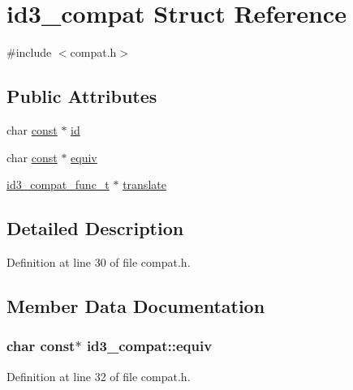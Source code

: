 \hypertarget{structid3__compat}{}\section{id3\+\_\+compat Struct Reference}
\label{structid3__compat}


{\ttfamily \#include $<$compat.\+h$>$}

\subsection*{Public Attributes}
\begin{DoxyCompactItemize}
\item 
char \hyperlink{getopt1_8c_a2c212835823e3c54a8ab6d95c652660e}{const} $\ast$ \hyperlink{structid3__compat_a4bbfd05aa33c47385219a3f8d4d711c4}{id}
\item 
char \hyperlink{getopt1_8c_a2c212835823e3c54a8ab6d95c652660e}{const} $\ast$ \hyperlink{structid3__compat_a425ee19ac8014f40ca4a2460c8f44aa3}{equiv}
\item 
\hyperlink{libid3tag_2compat_8h_afdd65fc8c780f84b3a5340f3d5ad2a18}{id3\+\_\+compat\+\_\+func\+\_\+t} $\ast$ \hyperlink{structid3__compat_a99f45f7c496cce28f8460562e949b427}{translate}
\end{DoxyCompactItemize}


\subsection{Detailed Description}


Definition at line 30 of file compat.\+h.



\subsection{Member Data Documentation}
\subsubsection[{\texorpdfstring{equiv}{equiv}}]{\setlength{\rightskip}{0pt plus 5cm}char {\bf const}$\ast$ id3\+\_\+compat\+::equiv}\hypertarget{structid3__compat_a425ee19ac8014f40ca4a2460c8f44aa3}{}\label{structid3__compat_a425ee19ac8014f40ca4a2460c8f44aa3}


Definition at line 32 of file compat.\+h.

